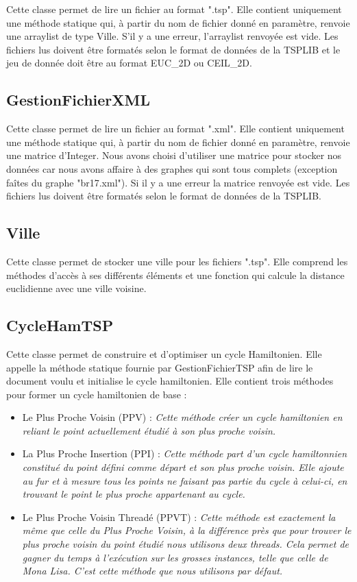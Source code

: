 \documentclass{article}
\begin{document}
Cette classe permet de lire un fichier au format ".tsp".
Elle contient uniquement une méthode statique qui, à partir du nom de fichier donné en paramètre, renvoie une arraylist de type Ville.
S'il y a une erreur, l'arraylist renvoyée est vide.
Les fichiers lus doivent être formatés selon le format de données de la TSPLIB et le jeu de donnée doit être au format EUC\_2D ou CEIL\_2D.

\subsection{GestionFichierXML}

Cette classe permet de lire un fichier au format ".xml".
Elle contient uniquement une méthode statique qui, à partir du nom de fichier donné en paramètre, renvoie une matrice d'Integer.
Nous avons choisi d'utiliser une matrice pour stocker nos données car nous avons affaire à des graphes qui sont tous complets (exception faîtes du graphe "br17.xml").
Si il y a une erreur la matrice renvoyée est vide.
Les fichiers lus doivent être formatés selon le format de données de la TSPLIB.

\subsection{Ville}

Cette classe permet de stocker une ville pour les fichiers ".tsp".
Elle comprend les méthodes d'accès à ses différents éléments et une fonction qui calcule la distance euclidienne avec une ville voisine.

\subsection{CycleHamTSP}

Cette classe permet de construire et d'optimiser un cycle Hamiltonien.
Elle appelle la méthode statique fournie par GestionFichierTSP afin de lire le document voulu et initialise le cycle hamiltonien.
Elle contient trois méthodes pour former un cycle hamiltonien de base :

\begin{itemize}
\item Le Plus Proche Voisin (PPV) : \emph{Cette méthode créer un cycle hamiltonien en reliant le point actuellement étudié à son plus proche voisin.}\smallskip

\item La Plus Proche Insertion (PPI) : \emph{Cette méthode part d'un cycle hamiltonnien constitué du point défini comme départ et son plus proche voisin. Elle ajoute au fur et à mesure tous les points ne faisant pas partie du cycle à celui-ci, en trouvant le point le plus proche appartenant au cycle.}\smallskip

\item Le Plus Proche Voisin Threadé (PPVT) : \emph{Cette méthode est exactement la même que celle du Plus Proche Voisin, à la différence près que pour trouver le plus proche voisin du point étudié nous utilisons deux threads. Cela permet de gagner du temps à l'exécution sur les grosses instances, telle que celle de Mona Lisa. C'est cette méthode que nous utilisons par défaut.}
\end{itemize}
\end{document}
